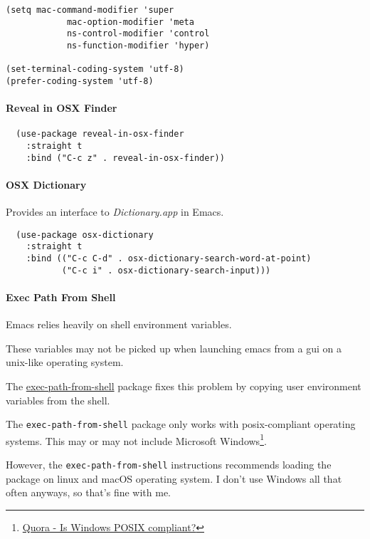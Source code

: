 \documentclass[11pt]{article}
\begin{document}
\begin{verbatim}
(setq mac-command-modifier 'super
            mac-option-modifier 'meta
            ns-control-modifier 'control
            ns-function-modifier 'hyper)

(set-terminal-coding-system 'utf-8)
(prefer-coding-system 'utf-8)
\end{verbatim}

\paragraph*{Reveal in OSX Finder}
\label{sec:org192255f}

\begin{verbatim}
  (use-package reveal-in-osx-finder
    :straight t
    :bind ("C-c z" . reveal-in-osx-finder))
\end{verbatim}

\paragraph*{OSX Dictionary}
\label{sec:orgff9b12b}

Provides an interface to \emph{Dictionary.app} in Emacs.

\begin{verbatim}
  (use-package osx-dictionary
    :straight t
    :bind (("C-c C-d" . osx-dictionary-search-word-at-point)
           ("C-c i" . osx-dictionary-search-input)))
\end{verbatim}

\paragraph*{Exec Path From Shell}
\label{sec:orgc53c222}

Emacs relies heavily on shell environment variables.

These variables may not be picked up when launching emacs
from a gui on a unix-like operating system.

The \href{https://github.com/purcell/exec-path-from-shell}{exec-path-from-shell} package fixes this problem by copying
user environment variables from the shell.

The \texttt{exec-path-from-shell} package only works with posix-compliant
operating systems. This may or may not include Microsoft Windows\footnote{\href{https://www.quora.com/Is-Windows-POSIX-compliant}{Quora - Is Windows POSIX compliant?}}.

However, the \texttt{exec-path-from-shell} instructions recommends loading
the package on linux and macOS operating system. I don't use Windows
all that often anyways, so that's fine with me.
\end{document}
